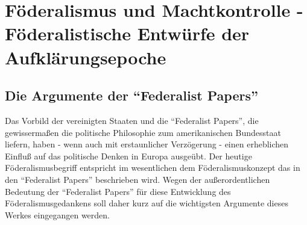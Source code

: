 \documentclass[a4paper,12pt]{article}
\begin{document}
\section{Föderalismus und Machtkontrolle - Föderalistische Entwürfe der
Aufklärungsepoche}

\subsection{Die Argumente der "`Federalist Papers"'}

Das Vorbild der vereinigten Staaten und die "`Federalist Papers"',
die gewissermaßen die politische Philosophie zum amerikanischen
Bundesstaat liefern, haben - wenn auch mit erstaunlicher
Verzögerung - einen erheblichen Einfluß auf das politische Denken
in Europa ausgeübt. Der heutige Föderalismusbegriff entspricht im
wesentlichen dem Föderalismuskonzept das in den "`Federalist
Papers"' beschrieben wird. Wegen der außerordentlichen Bedeutung der
"`Federalist Papers"' für diese Entwicklung des
Föderalismusgedankens soll daher kurz auf die wichtigsten Argumente
dieses Werkes eingegangen werden.
\end{document}
